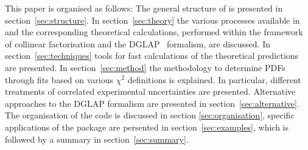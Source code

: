 This paper is organised as follows:
%
The general structure of \fitter is presented in section~\ref{sec:structure}.
In section~\ref{sec:theory} the various processes available in \fitter
and the corresponding theoretical calculations, performed within the framework of collinear factorisation and the DGLAP~\cite{Gribov:1972ri,Gribov:1972rt,Lipatov:1974qm,
Dokshitzer:1977sg,Altarelli:1977zs} formalism, are discussed. In
section~\ref{sec:techniques} tools for fast calculations of the theoretical predictions are presented.
In section~\ref{sec:method} the 
methodology to determine PDFs through fits based on various
 $\chi^2$ definitions is explained. In particular, different treatments of correlated experimental uncertainties are presented.
Alternative approaches to the DGLAP formalism are presented in section~\ref{sec:alternative}.
%
The organisation of the \fitter code is discussed in section \ref{sec:organisation}, specific applications 
of the package are persented in section~\ref{sec:examples}, which is followed by a summary in section~\ref{sec:summary}.
%
